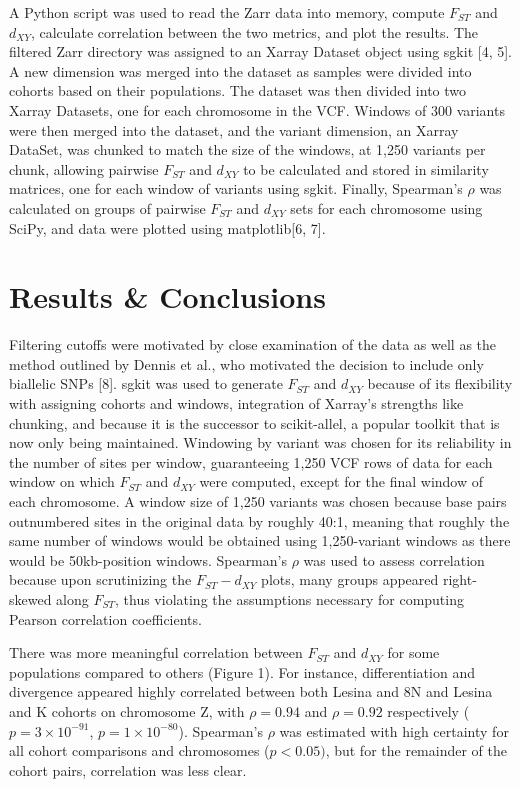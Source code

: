 \documentclass{article}
\begin{document}
A Python script was used to read the Zarr data into memory, compute $F_{ST}$ and $d_{XY}$, calculate correlation between the two metrics, and plot the results. The filtered Zarr directory was assigned to an Xarray Dataset object using sgkit [4, 5]. A new dimension was merged into the dataset as samples were divided into cohorts based on their populations. The dataset was then divided into two Xarray Datasets, one for each chromosome in the VCF. Windows of 300 variants were then merged into the dataset, and the variant dimension, an Xarray DataSet, was chunked to match the size of the windows, at 1,250 variants per chunk, allowing pairwise $F_{ST}$ and $d_{XY}$ to be calculated and stored in similarity matrices, one for each window of variants using sgkit. Finally, Spearman's $\rho$ was calculated on groups of pairwise $F_{ST}$ and $d_{XY}$ sets for each chromosome using SciPy, and data were plotted using matplotlib[6, 7].

\section{Results \& Conclusions}


Filtering cutoffs were motivated by close examination of the data as well as the method outlined by Dennis et al., who motivated the decision to include only biallelic SNPs [8]. sgkit was used to generate $F_{ST}$ and $d_{XY}$ because of its flexibility with assigning cohorts and windows, integration of Xarray's strengths like chunking, and because it is the successor to scikit-allel, a popular toolkit that is now only being maintained. Windowing by variant was chosen for its reliability in the number of sites per window, guaranteeing 1,250 VCF rows of data for each window on which $F_{ST}$ and $d_{XY}$ were computed, except for the final window of each chromosome. A window size of 1,250 variants was chosen because base pairs outnumbered sites in the original data by roughly 40:1, meaning that roughly the same number of windows would be obtained using 1,250-variant windows as there would be 50kb-position windows. Spearman's $\rho$ was used to assess correlation because upon scrutinizing the $F_{ST}-d_{XY}$ plots, many groups appeared right-skewed along $F_{ST}$, thus violating the assumptions necessary for computing Pearson correlation coefficients.

There was more meaningful correlation between $F_{ST}$ and $d_{XY}$ for some populations compared to others (Figure 1). For instance, differentiation and divergence appeared highly correlated between both Lesina and 8N and Lesina and K cohorts on chromosome Z, with $\rho = 0.94$ and $\rho = 0.92$ respectively ($p = 3 \times 10^{-91}$, $p=1\times10^{-80}$). Spearman's $\rho$ was estimated with high certainty for all cohort comparisons and chromosomes ($p<0.05)$, but for the remainder of the cohort pairs, correlation was less clear.
\end{document}
